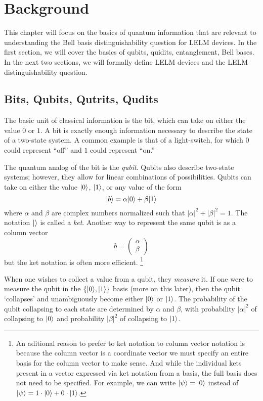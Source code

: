 \chapter{Background}

This chapter will focus on the basics of quantum information that are relevant to understanding the Bell basis distinguishability question for LELM devices. In the first section, we will cover the basics of qubits, quidits, entanglement, Bell bases. In the next two sections, we will formally define LELM devices and the LELM distinguishability question.

\section{Bits, Qubits, Qutrits, Qudits}


The basic unit of classical information is the bit, which can take on either the value $0$ or $1$. A bit is exactly enough information necessary to describe the state of a two-state system. A common example is that of a light-switch, for which $0$ could represent ``off'' and $1$ could represent ``on.''

The quantum analog of the bit is the \textit{qubit}. Qubits also describe two-state systems; however, they allow for linear combinations of possibilities. Qubits can take on either the value $| 0 \rangle$, $| 1 \rangle$, or any value of the form
\[
| b \rangle = \alpha | 0 \rangle + \beta | 1 \rangle
\]
where $\alpha$ and $\beta$ are complex numbers normalized such that $|\alpha|^2 + |\beta|^2 = 1$. The notation $|  \rangle$ is called a \textit{ket}. Another way to represent the same qubit is as a column vector
\[b = 
\begin{pmatrix}
	\alpha \\
	\beta
\end{pmatrix}
\]
but the ket notation is often more efficient. \footnote{An aditional reason to prefer to ket notation to column vector notation is because the column vector is a coordinate vector we must specify an entire basis for the column vector to make sense. And while the individual kets present in a vector expressed via ket notation from a basis, the full basis does not need to be specified. For example, we can write $| \psi \rangle = | 0 \rangle$ instead of $| \psi \rangle = 1 \cdot | 0 \rangle + 0 \cdot | 1 \rangle$.}

When one wishes to collect a value from a qubit, they \textit{measure} it. If one were to measure the qubit in the $\{| 0 \rangle, | 1 \rangle\}$ basis (more on this later), then the qubit `collapses' and unambiguously become either $| 0 \rangle$ or $| 1 \rangle$. The probability of the qubit collapsing to each state are determined by $\alpha$ and $\beta$, with probability $|\alpha|^2$ of collapsing to $| 0 \rangle$ and probability $|\beta|^2$ of collapsing to $| 1 \rangle$.

